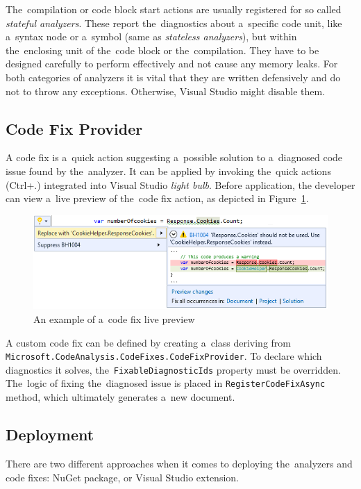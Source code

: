 \documentclass[
  digital, %
  table,   %
  lof,     %
  lot,     %
  oneside,
]{fithesis3}
\begin{document}
The~compilation or code block start actions are usually registered for so called \textit{stateful analyzers}. These report the~diagnostics about a~specific code unit, like a~syntax node or a~symbol (same as \textit{stateless analyzers}), but within the~enclosing unit of the~code block or the~compilation. They have to be designed carefully to perform effectively and not cause any memory leaks. For both categories of analyzers it is vital that they are written defensively and do not to throw any exceptions. Otherwise, Visual Studio might disable them.

\subsection{Code Fix Provider}
A code fix is a~quick action suggesting a~possible solution to a~diagnosed code issue found by the~analyzer. It can be applied by invoking the~quick actions (Ctrl+.) integrated into Visual Studio \textit{light bulb}. Before application, the developer can view a~live preview of the~code fix action, as depicted in Figure~\ref{fig:codefix-example}.

\begin{figure}[h!]
		\centering
			\includegraphics[scale=0.75]{img/codefix-example}
		\caption{An example of a~code fix live preview}
		\label{fig:codefix-example}
\end{figure}

A custom code fix can be defined by creating a~class deriving from \texttt{Microsoft.CodeAnalysis.CodeFixes.CodeFixProvider}. To declare which diagnostics it solves, the~\texttt{FixableDiagnosticIds} property must be overridden. The~logic of fixing the~diagnosed issue is placed in \texttt{RegisterCodeFixAsync} method, which ultimately generates a~new document.

\newpage
\subsection{Deployment}
There are two different approaches when it comes to deploying the~analyzers and code fixes: NuGet package, or Visual Studio extension. 
\end{document}
